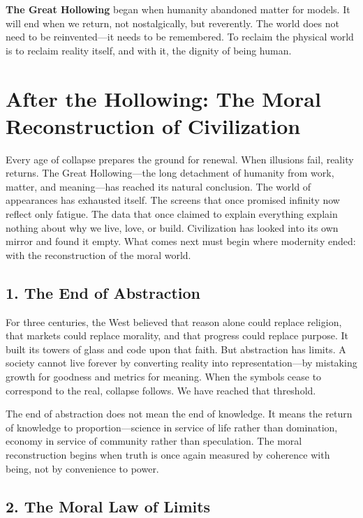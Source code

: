 \documentclass[11pt,twoside]{book}
\begin{document}
\textbf{The Great Hollowing} began when humanity abandoned matter for models.  
It will end when we return, not nostalgically, but reverently.  
The world does not need to be reinvented—it needs to be remembered.  
To reclaim the physical world is to reclaim reality itself, and with it, the dignity of being human.

% 
\chapter{After the Hollowing: The Moral Reconstruction of Civilization}
\label{ch:41}

Every age of collapse prepares the ground for renewal.  
When illusions fail, reality returns.  
The Great Hollowing—the long detachment of humanity from work, matter, and meaning—has reached its natural conclusion.  
The world of appearances has exhausted itself.  
The screens that once promised infinity now reflect only fatigue.  
The data that once claimed to explain everything explain nothing about why we live, love, or build.  
Civilization has looked into its own mirror and found it empty.  
What comes next must begin where modernity ended: with the reconstruction of the moral world.

\section*{1. The End of Abstraction}

For three centuries, the West believed that reason alone could replace religion, that markets could replace morality, and that progress could replace purpose.  
It built its towers of glass and code upon that faith.  
But abstraction has limits.  
A society cannot live forever by converting reality into representation—by mistaking growth for goodness and metrics for meaning.  
When the symbols cease to correspond to the real, collapse follows.  
We have reached that threshold.

The end of abstraction does not mean the end of knowledge.  
It means the return of knowledge to proportion—science in service of life rather than domination, economy in service of community rather than speculation.  
The moral reconstruction begins when truth is once again measured by coherence with being, not by convenience to power.

\section*{2. The Moral Law of Limits}
\end{document}
